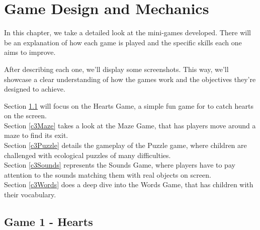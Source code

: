 \raggedbottom
\chapter{Game Design and Mechanics}
\label{cha:games_to_be_developed}


In this chapter, we take a detailed look at the mini-games developed. There will be an explanation of how each game is played and the specific skills each one aims to improve.

After describing each one, we'll display some screenshots. This way, we'll showcase a clear understanding of how the games work and the objectives they’re designed to achieve.

Section \ref{c3hearts} will focus on the Hearts Game, a simple fun game for to catch hearts on the screen.
\\Section \ref{c3Maze} takes a look at the Maze Game, that has players move around a maze to find its exit.
\\Section \ref{c3Puzzle} details the gameplay of the Puzzle game, where children are challenged with ecological puzzles of many difficulties.
\\Section \ref{c3Sounds} represents the Sounds Game, where players have to pay attention to the sounds matching them with real objects on screen.
\\Section \ref{c3Words} does a deep dive into the Words Game, that has children with their vocabulary.



\newpage
\section{Game 1 - Hearts}
\label{c3hearts}

